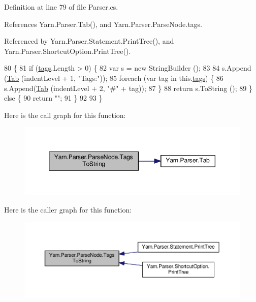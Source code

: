 Definition at line 79 of file Parser.\-cs.



References Yarn.\-Parser.\-Tab(), and Yarn.\-Parser.\-Parse\-Node.\-tags.



Referenced by Yarn.\-Parser.\-Statement.\-Print\-Tree(), and Yarn.\-Parser.\-Shortcut\-Option.\-Print\-Tree().


\begin{DoxyCode}
80             \{
81                 \textcolor{keywordflow}{if} (\hyperlink{a00150_a58b3a15788fd2d4127d73619dc6d04ae}{tags}.Length > 0) \{
82                     var s = \textcolor{keyword}{new} StringBuilder ();
83 
84                     s.Append (\hyperlink{a00151_aa8fa36b46de12a1c561d77b99c4b9ae3}{Tab} (indentLevel + 1, \textcolor{stringliteral}{"Tags:"}));
85                     \textcolor{keywordflow}{foreach} (var tag \textcolor{keywordflow}{in} this.\hyperlink{a00150_a58b3a15788fd2d4127d73619dc6d04ae}{tags}) \{
86                         s.Append(\hyperlink{a00151_aa8fa36b46de12a1c561d77b99c4b9ae3}{Tab} (indentLevel + 2, \textcolor{stringliteral}{"#"} + tag));
87                     \}
88                     \textcolor{keywordflow}{return} s.ToString ();
89                 \} \textcolor{keywordflow}{else} \{
90                     \textcolor{keywordflow}{return} \textcolor{stringliteral}{""};
91                 \}
92 
93             \}
\end{DoxyCode}


Here is the call graph for this function\-:
\nopagebreak
\begin{figure}[H]
\begin{center}
\leavevmode
\includegraphics[width=350pt]{a00150_a054f36c80d5eeacd569a8859f599af67_cgraph}
\end{center}
\end{figure}




Here is the caller graph for this function\-:
\nopagebreak
\begin{figure}[H]
\begin{center}
\leavevmode
\includegraphics[width=350pt]{a00150_a054f36c80d5eeacd569a8859f599af67_icgraph}
\end{center}
\end{figure}


